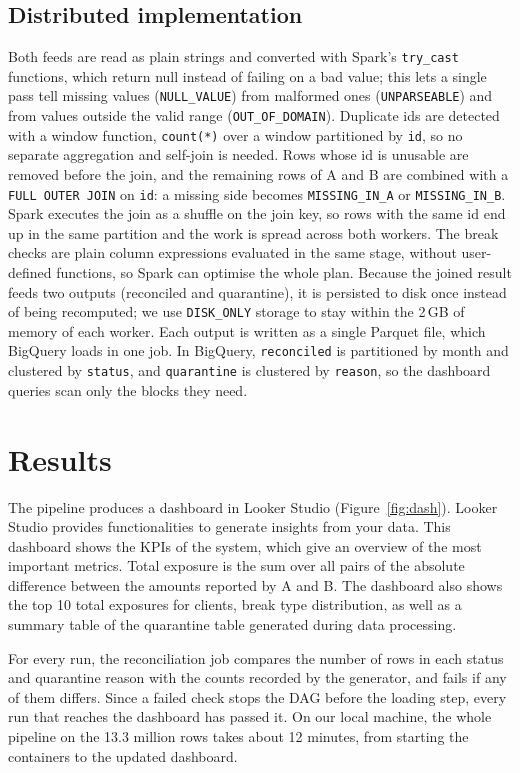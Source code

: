 \documentclass[11pt,a4paper]{article}
\newcommand{\code}[1]{\texttt{#1}}
\begin{document}
\subsection{Distributed implementation}
Both feeds are read as plain strings and converted with Spark's \code{try\_cast} functions, which return null instead of failing on a bad value; this lets a single pass tell missing values (\code{NULL\_VALUE}) from malformed ones (\code{UNPARSEABLE}) and from values outside the valid range (\code{OUT\_OF\_DOMAIN}).
Duplicate ids are detected with a window function, \code{count(*)} over a window partitioned by \code{id}, so no separate aggregation and self-join is needed.
Rows whose id is unusable are removed before the join, and the remaining rows of A and B are combined with a \code{FULL OUTER JOIN} on \code{id}: a missing side becomes \code{MISSING\_IN\_A} or \code{MISSING\_IN\_B}.
Spark executes the join as a shuffle on the join key, so rows with the same id end up in the same partition and the work is spread across both workers.
The break checks are plain column expressions evaluated in the same stage, without user-defined functions, so Spark can optimise the whole plan.
Because the joined result feeds two outputs (reconciled and quarantine), it is persisted to disk once instead of being recomputed; we use \code{DISK\_ONLY} storage to stay within the 2\,GB of memory of each worker.
Each output is written as a single Parquet file, which BigQuery loads in one job.
In BigQuery, \code{reconciled} is partitioned by month and clustered by \code{status}, and \code{quarantine} is clustered by \code{reason}, so the dashboard queries scan only the blocks they need.

\section{Results}
The pipeline produces a dashboard in Looker Studio (Figure~\ref{fig:dash}).
Looker Studio provides functionalities to generate insights from your data.
This dashboard shows the KPIs of the system, which give an overview of the most important metrics.
Total exposure is the sum over all pairs of the absolute difference between the amounts reported by A and B.
The dashboard also shows the top 10 total exposures for clients, break type distribution, as well as a summary table of the quarantine table generated during data processing.

For every run, the reconciliation job compares the number of rows in each status and quarantine reason with the counts recorded by the generator, and fails if any of them differs.
Since a failed check stops the DAG before the loading step, every run that reaches the dashboard has passed it.
On our local machine, the whole pipeline on the 13.3 million rows takes about 12 minutes, from starting the containers to the updated dashboard.
\end{document}
